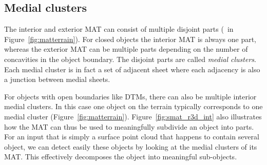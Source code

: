 \subsection{Medial clusters}
The interior and exterior MAT can consist of multiple disjoint parts (\eg\ in Figure~\ref{fig:matterrain}).
For closed objects the interior MAT is always one part, whereas the exterior MAT can be multiple parts depending on the number of concavities in the object boundary.
The disjoint parts are called \emph{medial clusters}.
Each medial cluster is in fact a set of adjacent sheet where each adjacency is also a junction between medial sheets.

For objects with open boundaries like DTMs, there can also be multiple interior medial clusters.
In this case one object on the terrain typically corresponds to one medial cluster (Figure~\ref{fig:matterrain}).
Figure~\ref{fig:smat_r3d_int} also illustrates how the MAT can thus be used to meaningfully subdivide an object into parts.
For an input that is simply a surface point cloud that happens to contain several object, we can detect easily these objects by looking at the medial clusters of its MAT.
This effectively decomposes the object into meaningful sub-objects.
